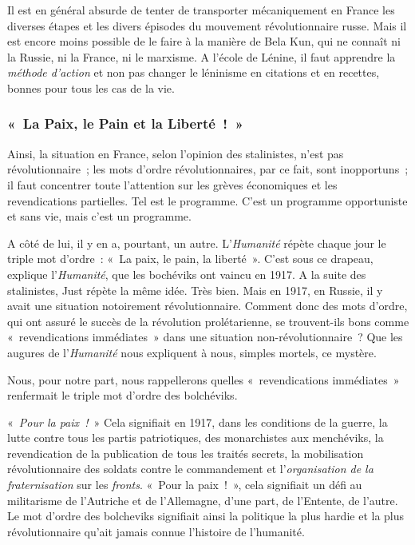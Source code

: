\documentclass[french,twoside]{book} %
\begin{document}
Il est en général absurde de tenter de transporter mécaniquement en France les diverses étapes et les divers épisodes du mouvement révolutionnaire russe. Mais il est encore moins possible de le faire à la manière de Bela Kun, qui ne connaît ni la Russie, ni la France, ni le marxisme. A l’école de Lénine, il faut apprendre la \emph{méthode d’action} et non pas changer le léninisme en citations et en recettes, bonnes pour tous les cas de la vie.
\subsubsection[{« La Paix, le Pain et la Liberté ! »}]{« La Paix, le Pain et la Liberté ! »}
\noindent Ainsi, la situation en France, selon l’opinion des stalinistes, n’est pas révolutionnaire ; les mots d’ordre révolutionnaires,  par ce fait, sont inopportuns ; il faut concentrer toute l’attention sur les grèves économiques et les revendications partielles. Tel est le programme. C’est un programme opportuniste et sans vie, mais c’est un programme.\par
A côté de lui, il y en a, pourtant, un autre. L’\emph{Humanité} répète chaque jour le triple mot d’ordre : « La paix, le pain, la liberté ». C’est sous ce drapeau, explique l’\emph{Humanité}, que les bochéviks ont vaincu en 1917. A la suite des stalinistes, Just répète la même idée. Très bien. Mais en 1917, en Russie, il y avait une situation notoirement révolutionnaire. Comment donc des mots d’ordre, qui ont assuré le succès de la révolution prolétarienne, se trouvent-ils bons comme « revendications immédiates » dans une situation non-révolutionnaire ? Que les augures de l’\emph{Humanité} nous expliquent à nous, simples mortels, ce mystère.\par
Nous, pour notre part, nous rappellerons quelles « revendications immédiates » renfermait le triple mot d’ordre des bolchéviks.\par
« \emph{Pour la paix !} » Cela signifiait en 1917, dans les conditions de la guerre, la lutte contre tous les partis patriotiques, des monarchistes aux menchéviks, la revendication de la publication de tous les traités secrets, la mobilisation révolutionnaire des soldats contre le commandement et l’\emph{organisation de la fraternisation} sur les \emph{fronts}. « Pour la paix ! », cela signifiait un défi au militarisme de l’Autriche et de l’Allemagne, d’une part, de l’Entente, de l’autre. Le mot d’ordre des bolcheviks signifiait ainsi la politique la plus hardie et la plus révolutionnaire qu’ait jamais connue l’histoire de l’humanité.\par
\end{document}
